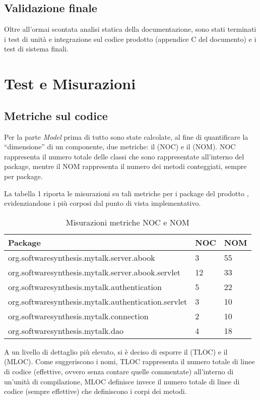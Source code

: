 \subsection {Validazione finale}
Oltre all'ormai scontata analisi statica della documentazione, sono stati terminati i test di unità e integrazione sul codice prodotto (appendice C del documento) e i test di sistema finali.
\clearpage

\section{Test e Misurazioni}
\subsection{Metriche sul codice}
Per la parte \textit{Model} prima di tutto sono state calcolate, al fine di quantificare la ``dimensione'' di un componente, due metriche: il  (NOC) e il  (NOM).
NOC rappresenta il numero totale delle classi che sono rappresentate all'interno del package, mentre il NOM rappresenta il numero dei metodi conteggiati, sempre per package.

La tabella 1 riporta le misurazioni su tali metriche per i package del prodotto \caName{}, evidenziandone i più corposi dal punto di vista implementativo.

\setcounter{table}{0}

\begin{table}[H]
\centering
{}
\begin{tabular}{p{}ll}
\toprule
Package & NOC  & NOM\\
\midrule
org.softwaresynthesis.mytalk.server.abook & 3 & 55\\
org.softwaresynthesis.mytalk.server.abook.servlet & 12 & 33\\
org.softwaresynthesis.mytalk.authentication & 5 & 22\\
org.softwaresynthesis.mytalk.authentication.servlet & 3 & 10\\
org.softwaresynthesis.mytalk.connection & 2 & 10\\
org.softwaresynthesis.mytalk.dao & 4 & 18\\
\bottomrule
\end{tabular}
\caption{Misurazioni metriche NOC e NOM} \label{tab:metricheNOCNOM}
\end{table}

A un livello di dettaglio più elevato, si è deciso di esporre il  (TLOC) e il  (MLOC).
Come suggeriscono i nomi, TLOC rappresenta il numero totale di linee di codice (effettive, ovvero senza contare quelle commentate) all'interno di un'unità di compilazione, MLOC definisce invece il numero totale di linee di codice (sempre effettive) che definiscono i corpi dei metodi. 

